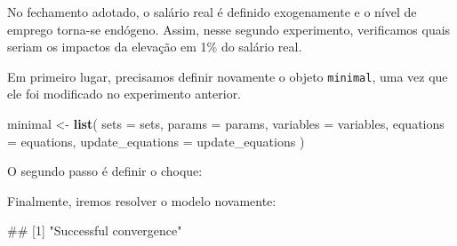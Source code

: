\documentclass[12pt,twoside]{article}
\newenvironment{Shaded}{\begin{snugshade}}{\end{snugshade}}
\newcommand{\DataTypeTok}[1]{\textcolor[rgb]{0.13,0.29,0.53}{#1}}
\newcommand{\FloatTok}[1]{\textcolor[rgb]{0.00,0.00,0.81}{#1}}
\newcommand{\KeywordTok}[1]{\textcolor[rgb]{0.13,0.29,0.53}{\textbf{#1}}}
\newcommand{\NormalTok}[1]{#1}
\newcommand{\OperatorTok}[1]{\textcolor[rgb]{0.81,0.36,0.00}{\textbf{#1}}}
\newcommand{\StringTok}[1]{\textcolor[rgb]{0.31,0.60,0.02}{#1}}
\let\oldShaded\Shaded
\let\endoldShaded\endShaded
\renewenvironment{Shaded}{\footnotesize\oldShaded}{\endoldShaded}
\let\oldverbatim\verbatim
\let\endoldverbatim\endverbatim
\renewenvironment{verbatim}{\footnotesize\oldverbatim}{\endoldverbatim}
\begin{document}
No fechamento adotado, o salário real é definido exogenamente e o nível
de emprego torna-se endógeno. Assim, nesse segundo experimento,
verificamos quais seriam os impactos da elevação em 1\% do salário real.

Em primeiro lugar, precisamos definir novamente o objeto
\texttt{minimal}, uma vez que ele foi modificado no experimento
anterior.

\begin{Shaded}
\begin{Highlighting}[]
\NormalTok{minimal <-}\StringTok{ }\KeywordTok{list}\NormalTok{(}
  \DataTypeTok{sets =}\NormalTok{ sets,}
  \DataTypeTok{params =}\NormalTok{ params,}
  \DataTypeTok{variables =}\NormalTok{ variables,}
  \DataTypeTok{equations =}\NormalTok{ equations,}
  \DataTypeTok{update_equations =}\NormalTok{ update_equations}
\NormalTok{)}
\end{Highlighting}
\end{Shaded}

O segundo passo é definir o choque:

\begin{Shaded}
\end{Shaded}

Finalmente, iremos resolver o modelo novamente:

\begin{Shaded}
\end{Shaded}

\begin{verbatim}
## [1] "Successful convergence"
\end{verbatim}
\end{document}
